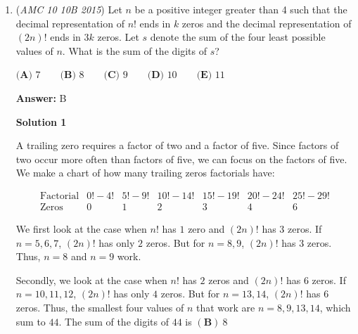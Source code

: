 \begin{enumerate}
 \textbf{Interim: To find sin(18) and other related values} To do a trig solution, it is neccesary to know how to derive sin(18).

 Notice if $\theta = 18$ then $sin(3\theta) = cos(2\theta)$The triple angle identites can then be found by direct substitution or De Moivre's Theorem (Uses $\text{cis} 3\theta =  \text{cis} \theta^3$).

 We get $4sin\theta - 3sin^3\theta = 1 - 2sin^2\theta$. Now we then get a cubic in $sin\theta$ and can use Rational Root Theorem (1 is a root but $sin\theta$ is not 1).

 Eventually we get $sin\theta =$ $\boxed{\frac{\sqrt{5} - 1}{4}}$ (not the other value since that is not in the domain of $f(x) = sin(x)$)

 


	\item (\textit{AMC 10 10B 2015}) Let $n$ be a positive integer greater than 4 such that the decimal representation of $n!$ ends in $k$ zeros and the decimal representation of $(2n)!$ ends in $3k$ zeros. Let $s$ denote the sum of the four least possible values of $n$. What is the sum of the digits of $s$?


 $\textbf{(A) }7\qquad\textbf{(B) }8\qquad\textbf{(C) }9\qquad\textbf{(D) }10\qquad\textbf{(E) }11$

 \textbf{Answer: }B



\textbf{Solution 1}

A trailing zero requires a factor of two and a factor of five. Since factors of two occur more often than factors of five, we can focus on the factors of five. We make a chart of how many trailing zeros factorials have:

 
 \[\begin{array}{c|c|c|c|c|c|c} \mathrm{Factorial}&0!-4!&5!-9!&10!-14!&15!-19!&20!-24!&25!-29!\\\hline \mathrm{Zeros}&0&1&2&3&4&6 \end{array}\]

 We first look at the case when $n!$ has $1$ zero and $(2n)!$ has $3$ zeros. If $n=5,6,7$, $(2n)!$ has only $2$ zeros. But for $n=8,9$, $(2n)!$ has $3$ zeros. Thus, $n=8$ and $n=9$ work.

 Secondly, we look at the case when $n!$ has $2$ zeros and $(2n)!$ has $6$ zeros. If $n=10,11,12$, $(2n)!$ has only $4$ zeros. But for $n=13,14$, $(2n)!$ has $6$ zeros. Thus, the smallest four values of $n$ that work are $n=8,9,13,14$, which sum to $44$. The sum of the digits of $44$ is $\boxed{\mathbf{(B)\ }8}$





\end{enumerate}
